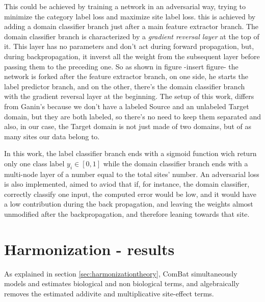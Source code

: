 \documentclass[12pt]{report}
\begin{document}
This could be achieved by training a network in an adversarial way, trying to minimize the category label loss and maximize site label loss.
this is achieved by adding a domain classifier branch just after a main feature extractor branch.
The domain classifier branch is characterized by a \emph{gradient reversal layer} at the top of it.
This layer has no parameters and don't act during forward propagation, but, during backpropagation, it inverst all the weight from the subsequent layer before passing them to the preceding one.
So as shown in figure -insert figure- the network is forked after the feature extractor branch, on one side, he starts the label predictor branch, and on the other, there's the domain classifier branch with the gradient reversal layer at the beginning.
The setup of this work, differs from Ganin's because we don't have a labeled Source and an unlabeled Target domain, but they are both labeled, so there's no need to keep them separated and also, in our case, the Target domain is not just made of two domains, but of as many sites our data belong to.


In this work, the label classifier branch ends with a sigmoid function wich return only one class label $y_i \in [0, 1]$ while the domain classifier branch ends with a multi-node layer of a number equal to the total sites' number.
An adversarial loss is also implemented, aimed to aviod that if, for instance, the domain classifier, correctly classify one input, the computed error would be low, and it would have a low contribution during the back propagation, and leaving the weights almost unmodified after the backpropagation, and therefore leaning towards that site.




\newpage


\chapter{Harmonization - results}


As explained in section \ref{sec:harmonizationtheory}, ComBat simultaneously models and estimates biological and non biological terms, and algebraically removes the estimated addivite and multiplicative site-effect terms.
\end{document}
